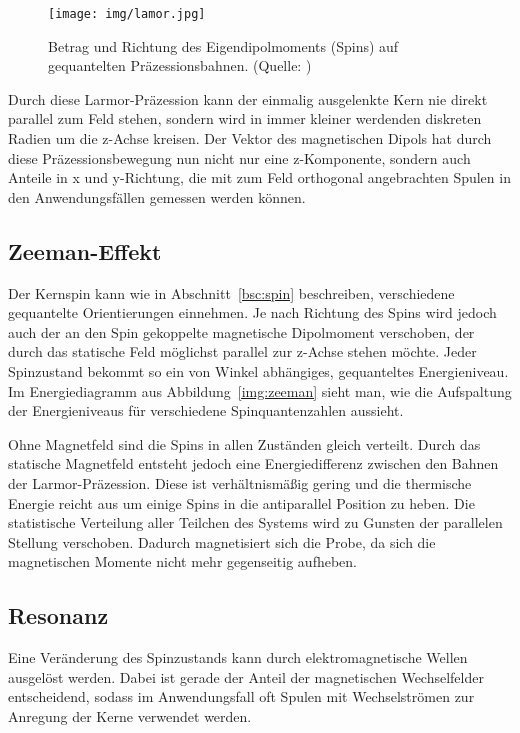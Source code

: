 \begin{figure*}
  \centering
  \texttt{[image: img/lamor.jpg]}
  \caption{Betrag und Richtung des Eigendipolmoments (Spins) auf gequantelten Präzessionsbahnen. (Quelle: )\label{img:lamor}}
\end{figure*}

Durch diese Larmor-Präzession kann der einmalig ausgelenkte Kern nie direkt parallel zum Feld stehen, sondern wird in immer kleiner werdenden diskreten Radien um die z-Achse kreisen. Der Vektor des magnetischen Dipols hat durch diese Präzessionsbewegung nun nicht nur eine z-Komponente, sondern auch Anteile in x und y-Richtung, die mit zum Feld orthogonal angebrachten Spulen in den Anwendungsfällen gemessen werden können.

\subsection{Zeeman-Effekt}
\label{bsc:zeeman}
Der Kernspin kann wie in Abschnitt~\ref{bsc:spin} beschreiben, verschiedene gequantelte Orientierungen einnehmen. Je nach Richtung des Spins wird jedoch auch der an den Spin gekoppelte magnetische Dipolmoment verschoben, der durch das statische Feld möglichst parallel zur z-Achse stehen möchte. Jeder Spinzustand bekommt so ein von Winkel abhängiges, gequanteltes Energieniveau. Im Energiediagramm aus Abbildung~\ref{img:zeeman} sieht man, wie die Aufspaltung der Energieniveaus für verschiedene Spinquantenzahlen aussieht. 

Ohne Magnetfeld sind die Spins in allen Zuständen gleich verteilt. Durch das statische Magnetfeld entsteht jedoch eine Energiedifferenz zwischen den Bahnen der Larmor-Präzession. Diese ist verhältnismä\ss{}ig gering und die thermische Energie reicht aus um einige Spins in die antiparallel Position zu heben. Die statistische Verteilung aller Teilchen des Systems wird zu Gunsten der parallelen Stellung verschoben. Dadurch magnetisiert sich die Probe, da sich die magnetischen Momente nicht mehr gegenseitig aufheben.

\subsection{Resonanz}
\label{bsc:resonance}

Eine Veränderung des Spinzustands kann durch elektromagnetische Wellen ausgelöst werden. Dabei ist gerade der Anteil der magnetischen Wechselfelder entscheidend, sodass im Anwendungsfall oft Spulen mit Wechselströmen zur Anregung der Kerne verwendet werden.

